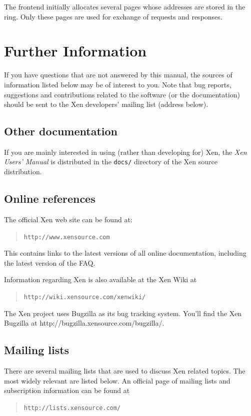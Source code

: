 \documentclass[11pt,twoside,final,openright,a4paper]{report}
\begin{document}
The frontend initially allocates several pages whose addresses
are stored in the ring. Only these pages are used for exchange of
requests and responses.


\chapter{Further Information}

If you have questions that are not answered by this manual, the
sources of information listed below may be of interest to you.  Note
that bug reports, suggestions and contributions related to the
software (or the documentation) should be sent to the Xen developers'
mailing list (address below).


\section{Other documentation}

If you are mainly interested in using (rather than developing for)
Xen, the \emph{Xen Users' Manual} is distributed in the {\tt docs/}
directory of the Xen source distribution.



\section{Online references}

The official Xen web site can be found at:
\begin{quote} {\tt http://www.xensource.com}
\end{quote}


This contains links to the latest versions of all online
documentation, including the latest version of the FAQ.

Information regarding Xen is also available at the Xen Wiki at
\begin{quote} {\tt http://wiki.xensource.com/xenwiki/}\end{quote}
The Xen project uses Bugzilla as its bug tracking system. You'll find
the Xen Bugzilla at http://bugzilla.xensource.com/bugzilla/.


\section{Mailing lists}

There are several mailing lists that are used to discuss Xen related
topics. The most widely relevant are listed below. An official page of
mailing lists and subscription information can be found at \begin{quote}
  {\tt http://lists.xensource.com/} \end{quote}
\end{document}
